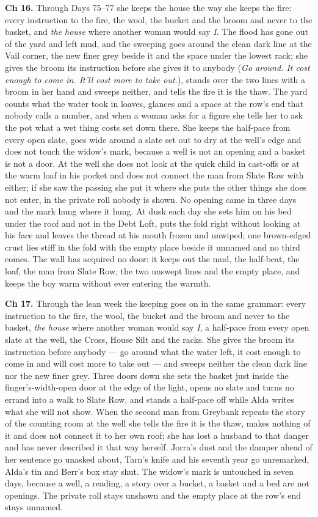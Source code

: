 \documentclass{design/chronicle}
\begin{document}
{\textbf{Ch 16.} Through Days 75–77 she keeps the house the way she keeps the fire: every instruction to the fire, the wool, the bucket and the broom and never to the basket, and \emph{the house} where another woman would say \emph{I}. The flood has gone out of the yard and left mud, and the sweeping goes around the clean dark line at the Vail corner, the new finer grey beside it and the space under the lowest rack; she gives the broom its instruction before she gives it to anybody (\emph{Go around. It cost enough to come in. It’ll cost more to take out.}), stands over the two lines with a broom in her hand and sweeps neither, and tells the fire it is the thaw. The yard counts what the water took in loaves, glances and a space at the row’s end that nobody calls a number, and when a woman asks for a figure she tells her to ask the pot what a wet thing costs set down there. She keeps the half-pace from every open slate, goes wide around a slate set out to dry at the well’s edge and does not touch the widow’s mark, because a well is not an opening and a basket is not a door. At the well she does not look at the quick child in cast-offs or at the warm loaf in his pocket and does not connect the man from Slate Row with either; if she saw the passing she put it where she puts the other things she does not enter, in the private roll nobody is shown. No opening came in three days and the mark hung where it hung. At dusk each day she sets him on his bed under the roof and not in the Debt Loft, puts the fold right without looking at his face and leaves the thread at his mouth frozen and unwiped; one brown-edged crust lies stiff in the fold with the empty place beside it unnamed and no third comes. The wall has acquired no door: it keeps out the mud, the half-beat, the loaf, the man from Slate Row, the two unswept lines and the empty place, and keeps the boy warm without ever entering the warmth.

\textbf{Ch 17.} Through the lean week the keeping goes on in the same grammar: every instruction to the fire, the wool, the bucket and the broom and never to the basket, \emph{the house} where another woman would say \emph{I}, a half-pace from every open slate at the well, the Cross, House Silt and the racks. She gives the broom its instruction before anybody — go around what the water left, it cost enough to come in and will cost more to take out — and sweeps neither the clean dark line nor the new finer grey. Three doors down she sets the basket just inside the finger’s-width-open door at the edge of the light, opens no slate and turns no errand into a walk to Slate Row, and stands a half-pace off while Alda writes what she will not show. When the second man from Greybank repeats the story of the counting room at the well she tells the fire it is the thaw, makes nothing of it and does not connect it to her own roof; she has lost a husband to that danger and has never described it that way herself. Jorra’s dust and the damper ahead of her sentence go unasked about, Tarn’s knife and his seventh year go unremarked, Alda’s tin and Berr’s box stay shut. The widow’s mark is untouched in seven days, because a well, a reading, a story over a bucket, a basket and a bed are not openings. The private roll stays unshown and the empty place at the row’s end stays unnamed.

}
\end{document}
